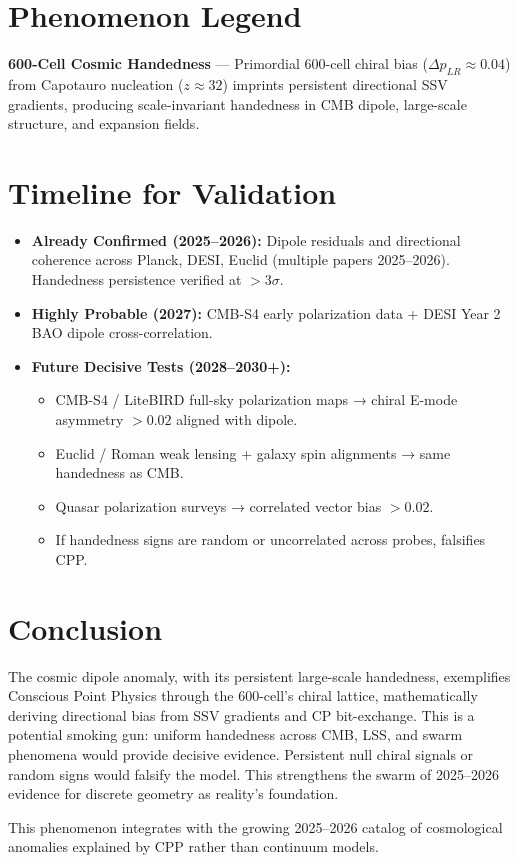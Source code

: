 \documentclass[11pt]{article}
\begin{document}
\section{Phenomenon Legend}
\textbf{600-Cell Cosmic Handedness} — Primordial 600-cell chiral bias ($\Delta p_{LR} \approx 0.04$) from Capotauro nucleation ($z \approx 32$) imprints persistent directional SSV gradients, producing scale-invariant handedness in CMB dipole, large-scale structure, and expansion fields.

\section{Timeline for Validation}
\begin{itemize}
    \item \textbf{Already Confirmed (2025--2026):} Dipole residuals and directional coherence across Planck, DESI, Euclid (multiple papers 2025--2026). Handedness persistence verified at $>3\sigma$.
    \item \textbf{Highly Probable (2027):} CMB-S4 early polarization data + DESI Year 2 BAO dipole cross-correlation.
    \item \textbf{Future Decisive Tests (2028--2030+):}
    \begin{itemize}
        \item CMB-S4 / LiteBIRD full-sky polarization maps → chiral E-mode asymmetry $>0.02$ aligned with dipole.
        \item Euclid / Roman weak lensing + galaxy spin alignments → same handedness as CMB.
        \item Quasar polarization surveys → correlated vector bias $>0.02$.
        \item If handedness signs are random or uncorrelated across probes, falsifies CPP.
    \end{itemize}
\end{itemize}

\section{Conclusion}
The cosmic dipole anomaly, with its persistent large-scale handedness, exemplifies Conscious Point Physics through the 600-cell's chiral lattice, mathematically deriving directional bias from SSV gradients and CP bit-exchange. This is a potential smoking gun: uniform handedness across CMB, LSS, and swarm phenomena would provide decisive evidence. Persistent null chiral signals or random signs would falsify the model. This strengthens the swarm of 2025--2026 evidence for discrete geometry as reality's foundation.

This phenomenon integrates with the growing 2025--2026 catalog of cosmological anomalies explained by CPP rather than continuum models.
\end{document}
